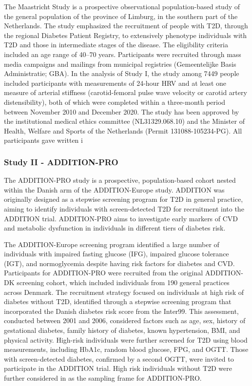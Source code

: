 \documentclass[
  a4paper,
  headsepline=true,
  open=any]{scrbook}
\begin{document}
The Maastricht Study is a prospective observational population-based
study of the general population of the province of Limburg, in the
southern part of the Netherlands. The study emphasized the recruitment
of people with T2D, through the regional Diabetes Patient Registry, to
extensively phenotype individuals with T2D and those in intermediate
stages of the disease. The eligibility criteria included an age range of
40--70 years. Participants were recruited through mass media campaigns
and mailings from municipal registries (Gemeentelijke Basis
Administratie; GBA). In the analysis of Study I, the study among 7449
people included participants with measurements of 24-hour HRV and at
least one measure of arterial stiffness (carotid-femoral pulse wave
velocity or carotid artery distensibility), both of which were completed
within a three-month period between November 2010 and December 2020. The
study has been approved by the institutional medical ethics committee
(NL31329.068.10) and the Minister of Health, Welfare and Sports of the
Netherlands (Permit 131088-105234-PG). All participants gave written i

\hypertarget{study-ii---addition-pro}{%
\subsubsection{Study II - ADDITION-PRO}\label{study-ii---addition-pro}}

The ADDITION-PRO study is a prospective, population-based cohort nested
within the Danish arm of the ADDITION-Europe study. ADDITION was
originally designed as a stepwise screening program for T2D in general
practice, aiming to identify individuals with screen-detected T2D for
recruitment into the ADDITION trial. ADDITION-PRO aims to investigate
early markers of CVD and metabolic dysfunction in individuals in
different tiers of diabetes risk.

The ADDITION-Europe screening program identified a large number of
individuals with impaired fasting glucose (IFG), impaired glucose
tolerance (IGT), and normoglycemia despite having risk factors for
diabetes and CVD. Participants for ADDITION-PRO were recruited from the
original ADDITION-DK screening cohort, which included individuals from
190 general practices across Denmark. The recruitment strategy focused
on individuals at high risk of diabetes without T2D, identified through
a stepwise screening program that incorporated the Danish diabetes risk
score from the Inter99. This assessment, conducted between 2001 and
2006, considered factors such as age, sex, history of gestational
diabetes, family history of diabetes, known hypertension, BMI, and
physical activity. High-risk individuals were further screened for T2D
using blood measurements, including HbA1c, random blood glucose, FPG,
and OGTT. Those with screen-detected diabetes, confirmed by a second
OGTT, were invited to participate in the ADDITION trial. High risk
individuals without T2D were further considered in as the sampling frame
for ADDITION-PRO.
\end{document}
